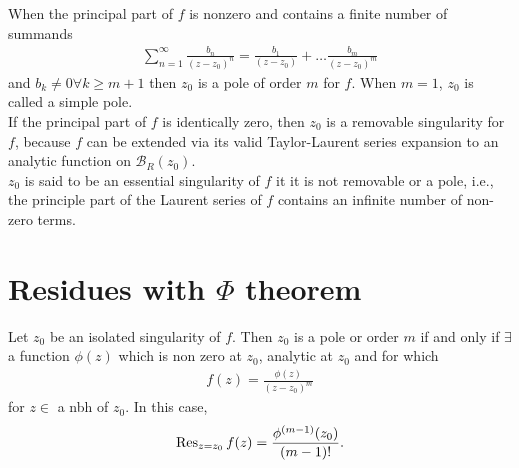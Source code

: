 \documentclass{article}
\theoremstyle{definition}
\newcommand{\f}[2]{\frac{#1}{#2}}
\begin{document}
When the principal part of $f$ is nonzero and contains a finite number of summands 
\begin{align}
\sum^\infty_{n=1}\f{b_n}{(z - z_0)^n} = \f{b_1}{(z - z_0)} + \dots \f{b_m}{(z - z_0)^m}
\end{align}
and $b_k \neq 0 \forall k \geq m+1$ then $z_0$ is a pole of order $m$ for $f$. When $m=1$, $z_0$ is called a simple pole.\\

If the principal part of $f$ is identically zero, then $z_0$ is a removable singularity for $f$, because $f$ can be extended via its valid Taylor-Laurent series expansion to an analytic function on $\mathcal{B}_R(z_0)$. \\

$z_0$ is said to be an essential singularity of $f$ it it is not removable or a pole, i.e., the principle part of the Laurent series of $f$ contains an infinite number of non-zero terms.  


\section{Residues with $\Phi$ theorem}

Let $z_0$ be an isolated singularity of $f$. Then $z_0$ is a pole or order $m$ if and only if $\exists$ a function $\phi(z)$ which is non zero at $z_0$, analytic at $z_0$ and for which 
\begin{align}
f(z) = \f{\phi(z)}{(z-z_0)^m}
\end{align}
for $z \in $ a nbh of $z_0$. In this case,
\begin{align}
\Res_{z = z_0} f(z) = \f{\phi^{(m-1)}(z_0)}{(m-1)!}.
\end{align}
\end{document}

